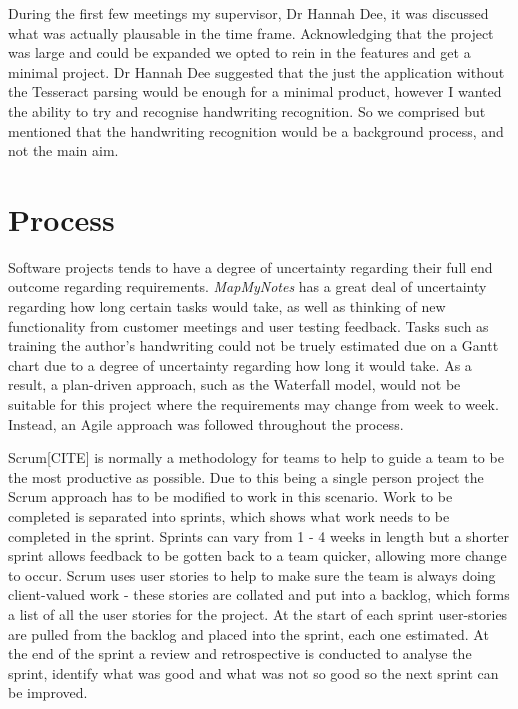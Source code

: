During the first few meetings my supervisor, Dr Hannah Dee, it was discussed what was actually plausable in the time frame. Acknowledging that the project was large and could be expanded we opted to rein in the features and get a minimal project. Dr Hannah Dee suggested that the just the application without the Tesseract parsing would be enough for a minimal product, however I wanted the ability to try and recognise handwriting recognition. So we comprised but mentioned that the handwriting recognition would be a background process, and not the main aim.

\section{Process}
Software projects tends to have a degree of uncertainty regarding their full end outcome regarding requirements. \textit{MapMyNotes} has a great deal of uncertainty regarding how long certain tasks would take, as well as thinking of new functionality from customer meetings and user testing feedback.  Tasks such as training the author's handwriting could not be truely estimated due on a Gantt chart due to a degree of uncertainty regarding how long it would take. As a result, a plan-driven approach, such as the Waterfall model, would not be suitable for this project where the requirements may change from week to week. Instead, an Agile approach was followed throughout the process. 

Scrum[CITE] is normally a methodology for teams to help to guide a team to be the most productive as possible. Due to this being a single person project the Scrum approach has to be modified to work in this scenario. Work to be completed is separated into sprints, which shows what work needs to be completed in the sprint. Sprints can vary from 1 - 4 weeks in length but a shorter sprint allows feedback to be gotten back to a team quicker, allowing more change to occur.  Scrum uses user stories to help to make sure the team is always doing client-valued work - these stories are collated and put into a backlog, which forms a list of all the user stories for the project. At the start of each sprint user-stories are pulled from the backlog and placed into the sprint, each one estimated. At the end of the sprint a review and retrospective is conducted to analyse the sprint, identify what was good and what was not so good so the next sprint can be improved.

